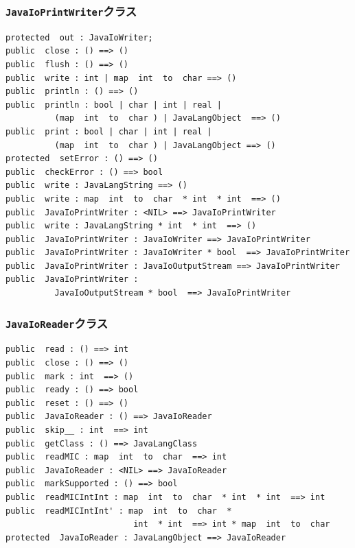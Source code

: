 \documentclass[\pformat,12pt]{jarticle}
\begin{document}
\subsubsection{\texttt{JavaIoPrintWriter}クラス}
\begin{small}
\begin{verbatim}
protected  out : JavaIoWriter;
public  close : () ==> ()
public  flush : () ==> ()
public  write : int | map  int  to  char ==> ()
public  println : () ==> ()
public  println : bool | char | int | real | 
          (map  int  to  char ) | JavaLangObject  ==> ()
public  print : bool | char | int | real | 
          (map  int  to  char ) | JavaLangObject ==> ()
protected  setError : () ==> ()
public  checkError : () ==> bool
public  write : JavaLangString ==> ()
public  write : map  int  to  char  * int  * int  ==> ()
public  JavaIoPrintWriter : <NIL> ==> JavaIoPrintWriter
public  write : JavaLangString * int  * int  ==> ()
public  JavaIoPrintWriter : JavaIoWriter ==> JavaIoPrintWriter
public  JavaIoPrintWriter : JavaIoWriter * bool  ==> JavaIoPrintWriter
public  JavaIoPrintWriter : JavaIoOutputStream ==> JavaIoPrintWriter
public  JavaIoPrintWriter : 
          JavaIoOutputStream * bool  ==> JavaIoPrintWriter
\end{verbatim}
\end{small}

\subsubsection{\texttt{JavaIoReader}クラス}
\begin{small}
\begin{verbatim}
public  read : () ==> int
public  close : () ==> ()
public  mark : int  ==> ()
public  ready : () ==> bool
public  reset : () ==> ()
public  JavaIoReader : () ==> JavaIoReader
public  skip__ : int  ==> int
public  getClass : () ==> JavaLangClass
public  readMIC : map  int  to  char  ==> int
public  JavaIoReader : <NIL> ==> JavaIoReader
public  markSupported : () ==> bool
public  readMICIntInt : map  int  to  char  * int  * int  ==> int
public  readMICIntInt' : map  int  to  char  * 
                          int  * int  ==> int * map  int  to  char
protected  JavaIoReader : JavaLangObject ==> JavaIoReader
\end{verbatim}
\end{small}
\end{document}
